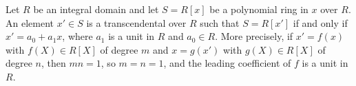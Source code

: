 Let $R$ be an integral domain and let $S = R[x]$ be a polynomial ring in $x$ over $R$. An element $x' \in S$ is a transcendental over $R$ such that $S = R[x']$ if and only if $x' = a_0 + a_1 x$, where $a_1$ is a unit in $R$ and $a_0 \in R$. More precisely, if $x' = f(x)$ with $f(X) \in R[X]$ of degree $m$ and $x = g(x')$ with $g(X) \in R[X]$ of degree $n$, then $mn = 1$, so $m = n = 1$, and the leading coefficient of $f$ is a unit in $R$.
